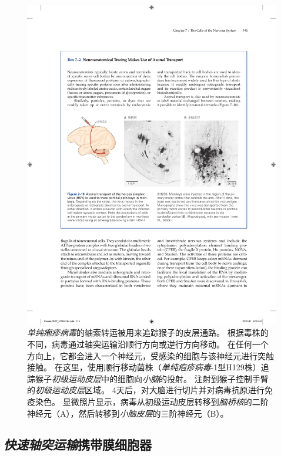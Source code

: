 \begin{figure}[htbp]
	\centering
	\includegraphics[width=1.0\linewidth]{chap07/fig_7_10}
	\caption{\textit{单纯疱疹病毒}的轴索转运被用来追踪猴子的皮层通路。
		根据毒株的不同，病毒通过轴突运输沿顺行方向或逆行方向移动。
		在任何一个方向上，它都会进入一个神经元，受感染的细胞与该神经元进行突触接触。
		在这里，使用顺行移动菌株（\textit{单纯疱疹病毒}-1型H129株）追踪猴子\textit{初级运动皮层}中的细胞向\textit{小脑}的投射。
		注射到猴子控制手臂的\textit{初级运动皮层}区域。
		4天后，对大脑进行切片并对病毒抗原进行免疫染色。
		显微照片显示，病毒从初级运动皮层转移到\textit{脑桥核}的二阶神经元（A），然后转移到\textit{小脑皮层}的三阶神经元（B）。}
	\label{fig:7_10}
\end{figure}



\subsection{\textit{快速轴突运输}携带膜细胞器}

